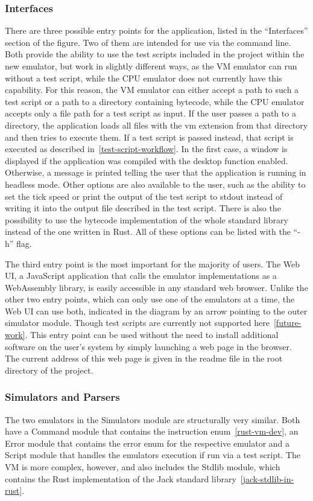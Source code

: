 \subsubsection{Interfaces} \label{interfaces}
There are three possible entry points for the application, listed in the ``Interfaces'' section of the figure.
Two of them are intended for use via the command line.
Both provide the ability to use the test scripts included in the project within the new emulator, but work in slightly different ways, as the VM emulator can run without a test script, while the CPU emulator does not currently have this capability.
For this reason, the VM emulator can either accept a path to such a test script or a path to a directory containing bytecode, while the CPU emulator accepts only a file path for a test script as input.
If the user passes a path to a directory, the application loads all files with the vm extension from that directory and then tries to execute them.
If a test script is passed instead, that script is executed as described in~\cref{test-script-workflow}.
In the first case, a window is displayed if the application was compiled with the desktop function enabled.
Otherwise, a message is printed telling the user that the application is running in headless mode.
Other options are also available to the user, such as the ability to set the tick speed or print the output of the test script to stdout instead of writing it into the output file described in the test script.
There is also the possibility to use the bytecode implementation of the whole standard library instead of the one written in Rust.
All of these options can be listed with the ``-h'' flag.

The third entry point is the most important for the majority of users.
The Web UI, a JavaScript application that calls the emulator implementations as a WebAssembly library, is easily accessible in any standard web browser.
Unlike the other two entry points, which can only use one of the emulators at a time, the Web UI can use both, indicated in the diagram by an arrow pointing to the outer simulator module.
Though test scripts are currently not supported here~\ref{future-work}.
This entry point can be used without the need to install additional software on the user's system by simply launching a web page in the browser.
The current address of this web page is given in the readme file in the root directory of the project.

\subsubsection{Simulators and Parsers}
The two emulators in the Simulators module are structurally very similar. Both have a Command module that contains the instruction enum~\ref{rust-vm-dev}, an Error module that contains the error enum for the respective emulator and a Script module that handles the emulators execution if run via a test script.
The VM is more complex, however, and also includes the Stdlib module, which contains the Rust implementation of the Jack standard library~\ref{jack-stdlib-in-rust}.

